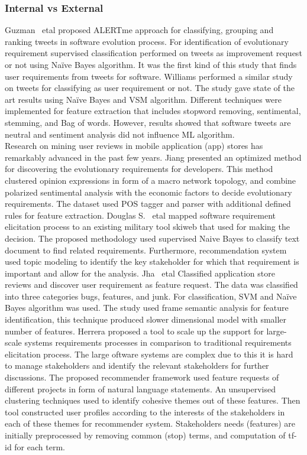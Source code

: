 \subsubsection{Internal vs External}
Guzman ~etal \cite{Guzman:2017} proposed ALERTme approach for classifying,
grouping and ranking tweets in software evolution process. For identification of
evolutionary requirement supervised classification performed on tweets as
improvement request or not using Naïve Bayes algorithm. It was the first kind of
this study that finds user requirements from tweets for software. Williams \etal
{} \cite{Williams:2017} performed a similar study on
tweets for classifying as user requirement or not. The study gave state of the art results using Naïve Bayes
and VSM algorithm. Different techniques were implemented for feature extraction
that includes stopword removing, sentimental, stemming, and Bag of words.
However, results showed that software tweets are neutral  and sentiment analysis did not influence ML algorithm.\\
Research on mining user reviews in mobile application (app) stores has
remarkably advanced in the past few years. Jiang \etal \cite{Jiang:2014}
presented an optimized method for discovering the evolutionary requirements for
developers. This method clustered opinion expressions in form of a macro network
topology, and combine polarized sentimental analysis with the economic factors
to decide evolutionary requirements. The dataset used POS tagger and parser with
additional defined rules for feature extraction. Douglas S. ~etal
\cite{Douglas:S2008} mapped software requirement elicitation process to an
existing military tool skiweb that used for making the decision. The proposed
methodology used supervised Naive Bayes to classify text document to find
related requirements. Furthermore, recommendation system used topic modeling to
identify the key stakeholder for which that requirement is important and allow
for the analysis. Jha ~etal \cite{Jha:2017} Classified application store reviews
and discover user requirement as feature request. The data was classified into
three categories bugs, features, and junk. For classification, SVM and Naïve
Bayes algorithm was used. The study used frame semantic analysis for feature
identification, this technique produced slower  dimensional model
with smaller number of features. Herrera\etal\cite{Castro-Herrera:2009} proposed a tool to scale up the support 
for large-scale systems requirements processes in comparison to traditional requirements elicitation process. The large oftware systems are complex due to this 
it is hard to manage stakeholders and identify the relevant stakeholders for further discussions.
The proposed recommender framework used feature requests of different projects in form of natural language statements. 
An unsupervised clustering techniques used to identify cohesive themes out of these features. Then tool constructed user
profiles according to the interests of the stakeholders in each of these themes for recommender system. Stakeholders needs (features) are initially preprocessed by
removing common (stop) terms, and computation of tf-id for each term. 

